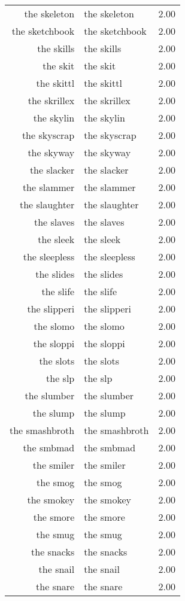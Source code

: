 \begin{table}[ht]
\begin{tabular}{rlr}
  the skeleton & the skeleton & 2.00 \\ 
  the sketchbook & the sketchbook & 2.00 \\ 
  the skills & the skills & 2.00 \\ 
  the skit & the skit & 2.00 \\ 
  the skittl & the skittl & 2.00 \\ 
  the skrillex & the skrillex & 2.00 \\ 
  the skylin & the skylin & 2.00 \\ 
  the skyscrap & the skyscrap & 2.00 \\ 
  the skyway & the skyway & 2.00 \\ 
  the slacker & the slacker & 2.00 \\ 
  the slammer & the slammer & 2.00 \\ 
  the slaughter & the slaughter & 2.00 \\ 
  the slaves & the slaves & 2.00 \\ 
  the sleek & the sleek & 2.00 \\ 
  the sleepless & the sleepless & 2.00 \\ 
  the slides & the slides & 2.00 \\ 
  the slife & the slife & 2.00 \\ 
  the slipperi & the slipperi & 2.00 \\ 
  the slomo & the slomo & 2.00 \\ 
  the sloppi & the sloppi & 2.00 \\ 
  the slots & the slots & 2.00 \\ 
  the slp & the slp & 2.00 \\ 
  the slumber & the slumber & 2.00 \\ 
  the slump & the slump & 2.00 \\ 
  the smashbroth & the smashbroth & 2.00 \\ 
  the smbmad & the smbmad & 2.00 \\ 
  the smiler & the smiler & 2.00 \\ 
  the smog & the smog & 2.00 \\ 
  the smokey & the smokey & 2.00 \\ 
  the smore & the smore & 2.00 \\ 
  the smug & the smug & 2.00 \\ 
  the snacks & the snacks & 2.00 \\ 
  the snail & the snail & 2.00 \\ 
  the snare & the snare & 2.00 \\ 

\end{tabular}
\end{table}
